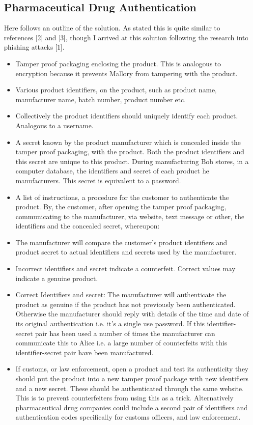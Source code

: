 \documentclass[smallextended]{svjour3}       	\smartqed  \usepackage{graphicx}
\begin{document}
\subsection{Pharmaceutical Drug Authentication}

Here follows an outline of the solution. As stated this is quite similar to references [2] and [3], though I arrived at this solution following the research into phishing attacks [1].

\vspace{1mm}

\begin{itemize}
  \item Tamper proof packaging enclosing the product. This is analogous to encryption because it prevents Mallory from tampering with the product.
  \item Various product identifiers, on the product, such as product name, manufacturer name, batch number, product number etc. 
  \item Collectively the product identifiers should uniquely identify each product. Analogous to a username.
  \item A secret known by the product manufacturer which is concealed inside the tamper proof packaging, with the product. Both the product identifiers and this secret are unique to this product. During manufacturing Bob stores, in a computer database, the identifiers and secret of each product he manufacturers. This secret is equivalent to a password.
  \item A list of instructions, a procedure for the customer to authenticate the product. By, the customer, after opening the tamper proof packaging, communicating to the manufacturer, via website, text message or other, the identifiers and the concealed secret, whereupon:
  \item The manufacturer will compare the customer's product identifiers and product secret to actual identifiers and secrets used by the manufacturer.
  \item Incorrect identifiers and secret indicate a counterfeit. Correct values may indicate a genuine product.
  \item Correct Identifiers and secret: The manufacturer will authenticate the product as genuine if the product has not previously been authenticated. Otherwise the manufacturer should reply with details of the time and date of its original authentication i.e. it's a single use password. If this identifier-secret pair has been used a number of times the manufacturer can communicate this to Alice i.e. a large number of counterfeits with this identifier-secret pair have been manufactured.
  \item If customs, or law enforcement, open a product and test its authenticity they should put the product into a new tamper proof package with new identifiers and a new secret. These should be authenticated through the same website. This is to prevent counterfeiters from using this as a trick. Alternatively pharmaceutical drug companies could include a second pair of identifiers and authentication codes specifically for customs officers, and law enforcement.
\end{itemize}
\end{document}
